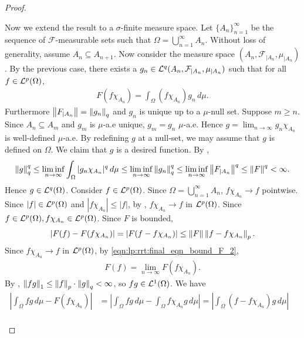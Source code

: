 \begin{proof}
\begin{step}
Now we extend the result to a $\sigma$-finite measure space. Let $\{ A_n \}_{n = 1}^{\infty}$ be the sequence of $\mathcal{F}$-measurable sets such that $\Omega = \bigcup_{n = 1}^{\infty} A_n$. Without loss of generality, assume $A_n \subseteq A_{n + 1}$. Now consider the measure space $(A_n, \mathcal{F}_{|A_n}, \mu_{|A_n})$. By the previous case, there exists a $g_n \in {\mathcal {L}^q}(A_n, \mathcal{F}_{|A_n}, \mu_{|A_n})$ such that for all $f \in {\mathcal {L}^p}(\Omega)$,
\begin{align*}
    F (f \chi_{A_n} ) = \int_\Omega (f \chi_{A_n}) g_n \,d\mu.
\end{align*}
Furthermore $\left\lVert F_{|A_n}\right\rVert = \left\lVert g_n\right\rVert_q$ and $g_n$ is unique up to a $\mu$-null set.
Suppose $m \geq n$. Since $A_n \subseteq A_m$ and $g_m$ is $\mu$-a.e unique, $g_m = g_n$ $\mu$-a.e. 
Hence $g = \lim_{n \to \infty} g_n \chi_{A_n}$ is well-defined $\mu$-a.e. By redefining $g$ at a null-set, we may assume that $g$ is defined on $\Omega$. We claim that $g$ is a desired function. By , 
\begin{align*}
    \left\lVert g\right\rVert_{q}^{q} \leq \liminf_{n \to \infty}{\int_\Omega |g_n \chi_{A_n}|^q } \,d\mu \leq \liminf_{n \to \infty}  \left\lVert g_n\right\rVert_q^q \leq \liminf_{n \to \infty} \left\lVert F_{|A_n}\right\rVert^q \leq \left\lVert F\right\rVert^q < \infty.
\end{align*}
Hence $g \in {\mathcal {L}^q}(\Omega)$.
Consider $f \in {\mathcal {L}^p}(\Omega)$. Since $\Omega = \bigcup_{n = 1}^{\infty} A_n$, $f \chi_{A_n} \rightarrow f$ pointwise. Since $|f| \in {\mathcal {L}^p}(\Omega)$ and $| f \chi_{A_n} | \leq | f |$, by , $f \chi_{A_n} \rightarrow f$ in ${\mathcal {L}^p}(\Omega)$. Since $f \in {\mathcal {L}^p}(\Omega), f \chi_{A_n} \in {\mathcal {L}^p}(\Omega)$. Since $F$ is bounded,
\begin{align}
     \label{eqn:lp:rrt:final_eqn_bound_F_2}
    | F(f) - F(f \chi_{A_n}) | = | F(f - f \chi_{A_n}) | \leq \left\lVert F\right\rVert \left\lVert f - f \chi_{A_n}\right\rVert_p.
\end{align}
Since $f \chi_{A_n} \rightarrow f$ in ${\mathcal {L}^p}(\Omega)$, by \ref{eqn:lp:rrt:final_eqn_bound_F_2},
\begin{align}
    \label{eqn:lp:rrt:final_eqn_bound_f_2}
    F(f) = \lim_{n \to \infty} F(f \chi_{A_n}).
\end{align}
By , $\left\lVert fg\right\rVert_1 \leq \left\lVert f\right\rVert_p \cdot \left\lVert g\right\rVert_q < \infty$, so $fg \in {\mathcal {L}^1}(\Omega)$.
We have
\begin{align*}
    \left | \int_\Omega f g \,d\mu  - F (f \chi_{A_n}) \right | &= \left |  \int_\Omega f g \,d\mu -  \int_\Omega f \chi_{A_n} g \,d\mu  \right | =  \left |  \int_\Omega (f - f \chi_{A_n}) g \,d\mu  \right |  & \\

\end{align*}
\end{step}
\end{proof}
